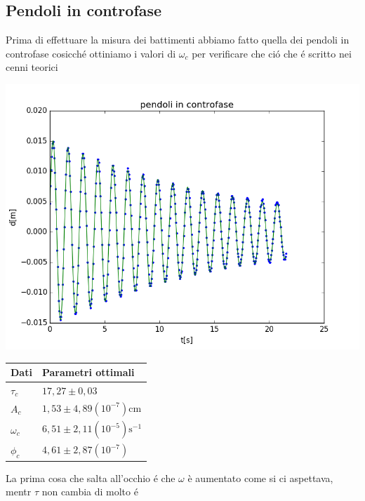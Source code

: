 \documentclass{exam}
\begin{document}
		\subsection{Pendoli in controfase}
			Prima di effettuare la misura dei battimenti abbiamo fatto quella dei pendoli in controfase cosicch\'e ottiniamo i valori di $\omega_{c}$ per verificare che ci\'o che \'e scritto nei cenni teorici\\
			\begin{minipage}{0.5\textwidth}
				\includegraphics[width=\textwidth]{controfase}
				\end{minipage}
			\begin{minipage}{0.5\textwidth}
				\begin{tabular}{ll}
					\toprule
					Dati & Parametri ottimali \\
					\midrule
					$\tau_{c}$ & $17,27 \pm 0,03$ \\
					$A_{c}$ & $1,53 \pm 4,89(10^{-7})$cm\\
					$\omega_{c}$ & $6,51 \pm 2,11(10^{-5})\textrm{s}^{-1}$\\			
					$\phi_{c}$ & $4,61 \pm 2,87(10^{-7})$\\
					\bottomrule
				\end{tabular}
			\end{minipage}
			La prima cosa che salta all'occhio \'e che $\omega$ è aumentato come si ci aspettava, mentr $\tau$ non cambia di molto \'e
\end{document}
